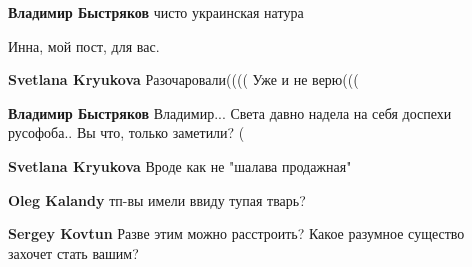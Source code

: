 \begin{itemize}
\begin{itemize}
 
\textbf{Владимир Быстряков} чисто украинская натура

 
Инна, мой пост, для вас.

 
\textbf{Svetlana Kryukova} Разочаровали(((( Уже и не верю(((

 
\textbf{Владимир Быстряков} Владимир... Света давно надела на себя доспехи русофоба.. Вы что, только заметили? (

 
\textbf{Svetlana Kryukova} Вроде как не "шалава продажная"

 
\textbf{Oleg Kalandy} тп-вы имели ввиду тупая тварь?

 
\textbf{Sergey Kovtun} Разве этим можно расстроить? Какое разумное существо захочет стать вашим?


\end{itemize}
\end{itemize}
